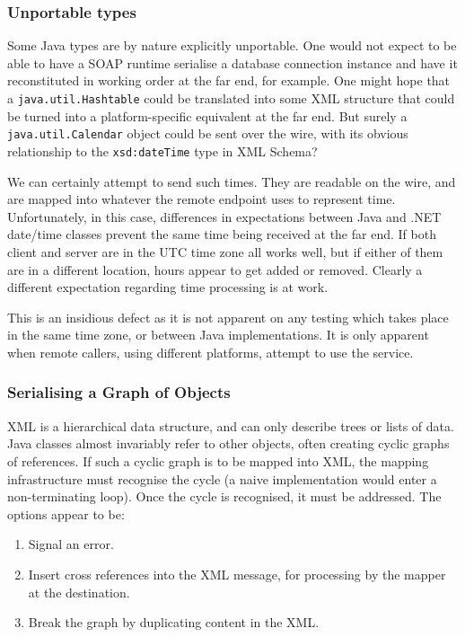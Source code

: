 \subsubsection{Unportable types}
\label{objections:o-x:types}

Some Java types are by nature explicitly unportable. One would not
expect to be able to have a SOAP runtime serialise a database
connection instance and have it reconstituted in working order at the
far end, for example. One might hope that a {\tt java.util.Hashtable}
could be translated into some XML structure that could be turned into
a platform-specific equivalent at the far end. But surely a {\tt
java.util.Calendar} object could be sent over the wire, with its
obvious relationship to the {\tt xsd:dateTime} type in XML Schema?

We can certainly attempt to send such times. They are readable on the
wire, and are mapped into whatever the remote endpoint uses to
represent time. Unfortunately, in this case, differences in
expectations between Java and .NET date/time classes prevent the same
time being received at the far end. If both client and server are in
the UTC time zone all works well, but if either of them are in a
different location, hours appear to get added or removed. Clearly a
different expectation regarding time processing is at work.

This is an insidious defect as it is not apparent on any
testing which takes place in the same time zone, or between Java
implementations. It is only apparent when remote callers, using
different platforms, attempt to use the service.


\subsubsection{Serialising a Graph of Objects}
\label{objections:o-x:graphs}

XML is a hierarchical data structure, and can only describe trees or
lists of data. Java classes almost invariably refer to other objects,
often creating cyclic graphs of references. If such a cyclic graph is
to be mapped into XML, the mapping infrastructure must recognise the
cycle (a naive implementation would enter a non-terminating
loop). Once the cycle is recognised, it must be addressed. The options
appear to be:
\begin{enumerate}
\item Signal an error.
\item Insert cross references into the XML message, for processing by
the mapper at the destination. 
\item Break the graph by duplicating content in the XML.
\end{enumerate}

